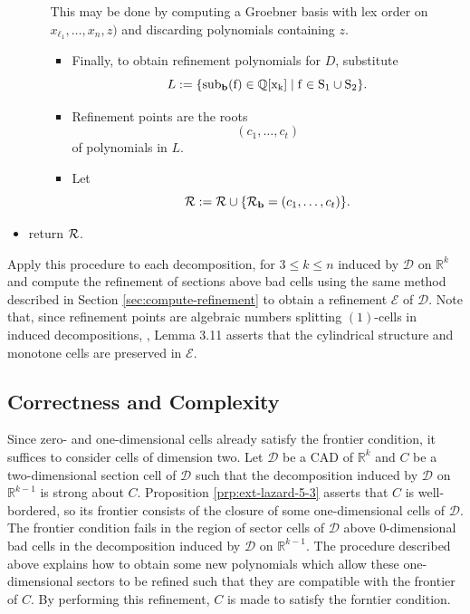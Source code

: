 \documentclass[
]{book}
\theoremstyle{definition}
\theoremstyle{definition}
\theoremstyle{definition}
\theoremstyle{definition}
\theoremstyle{remark}
\begin{document}
\begin{itemize}
\begin{itemize}
    This may be done by computing a Groebner basis with lex order on \(x_{\ell_1},\ldots,x_n,z)\) and discarding polynomials containing \(z\).

    \begin{itemize}
    \item
      Finally, to obtain refinement polynomials for \(D\), substitute
      \[
      L := \{ \rm{sub}_{\mathbf{b}}(f) \in \mathbb{Q}[x_k] \mid f \in S_1 \cup S_2 \}.
      \]
    \item
      Refinement points are the roots
      \[
      (c_1,\ldots,c_t)
      \]
      of polynomials in \(L\).
    \item
      Let
      \[
      {\cal R} := {\cal R} \cup \{ {\cal R}_{\mathbf{b}} = (c_1,\ldots,c_t) \}.
      \]
    \end{itemize}
  \end{itemize}
\item
  return \(\cal R\).
\end{itemize}

Apply this procedure to each decomposition, for \(3 \le k \le n\) induced by \(\mathcal{D}\) on \(\mathbb{R}^k\) and compute the refinement of sections above bad cells using the same method described in Section \ref{sec:compute-refinement} to obtain a refinement \(\mathcal{E}\) of \(\mathcal{D}\). Note that, since refinement points are algebraic numbers splitting \((1)\)-cells in induced decompositions, \citet{bgv15}, Lemma 3.11 asserts that the cylindrical structure and monotone cells are preserved in \(\mathcal{E}\).

\hypertarget{correctness-and-complexity-2}{%
\subsection{Correctness and Complexity}\label{correctness-and-complexity-2}}

Since zero- and one-dimensional cells already satisfy the frontier condition, it suffices to consider cells of dimension two.
Let \(\mathcal{D}\) be a CAD of \(\mathbb{R}^k\) and \(C\) be a two-dimensional section cell of \(\mathcal{D}\) such that the decomposition induced by \(\mathcal{D}\) on \(\mathbb{R}^{k-1}\) is strong about \(C\). Proposition \ref{prp:ext-lazard-5-3} asserts that \(C\) is well-bordered, so its frontier consists of the closure of some one-dimensional cells of \(\mathcal{D}\). The frontier condition fails in the region of sector cells of \(\mathcal{D}\) above \(0\)-dimensional bad cells in the decomposition induced by \(\mathcal{D}\) on \(\mathbb{R}^{k-1}\).
The procedure described above explains how to obtain some new polynomials which allow these one-dimensional sectors to be refined such that they are compatible with the frontier of \(C\). By performing this refinement, \(C\) is made to satisfy the forntier condition.
\end{document}
